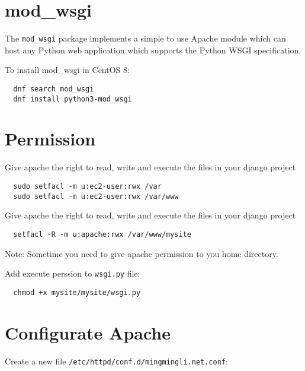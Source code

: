 \section{mod\_wsgi}

The \verb|mod_wsgi| package implements a simple to use Apache module which can host any Python web application which supports the Python WSGI specification.

To install mod\_wsgi in CentOS 8:
\begin{lstlisting}
  dnf search mod_wsgi
  dnf install python3-mod_wsgi
\end{lstlisting}


\section{Permission}

Give apache the right to read, write and execute the files in your django project
\begin{lstlisting}
  sudo setfacl -m u:ec2-user:rwx /var
  sudo setfacl -m u:ec2-user:rwx /var/www
\end{lstlisting}

Give apache the right to read, write and execute the files in your django project
\begin{lstlisting}
  setfacl -R -m u:apache:rwx /var/www/mysite
\end{lstlisting}

Note: Sometime you need to give apache permission to you home directory.

Add execute perssion to \verb|wsgi.py| file:
\begin{lstlisting}
  chmod +x mysite/mysite/wsgi.py
\end{lstlisting}

\section{Configurate Apache}
Create a new file \verb|/etc/httpd/conf.d/mingmingli.net.conf|:

